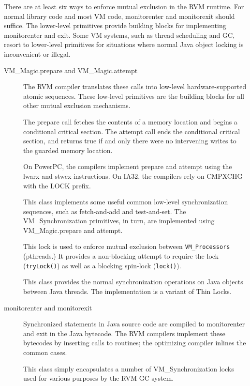 There are at least six ways to enforce mutual exclusion in the
RVM runtime.  For normal library code and most VM code, monitorenter and
monitorexit should suffice.  The lower-level primitives provide 
building blocks for implementing monitorenter and exit. Some VM systems,
such as thread scheduling and GC, resort to lower-level primitives for
situations where normal Java object locking is inconvenient or illegal.
\begin{description}
\item [VM\_Magic.prepare and VM\_Magic.attempt]
The RVM compiler translates these 
calls into low-level
hardware-supported atomic sequences.  These low-level primitives are the 
building blocks for all other mutual exclusion mechanisms. 

The prepare call fetches the
contents of a memory location and begins a conditional critical section.
The attempt call ends the conditional critical section, and returns true
if and only there were no intervening writes to the guarded memory
location.

On PowerPC, the compilers implement prepare and attempt using the lwarx
and stwcx instructions.  On IA32, the compilers rely on CMPXCHG with the
LOCK prefix.
\item []
This class implements some useful common low-level synchronization
sequences, such as fetch-and-add and test-and-set.  The VM\_Synchronization
primitives, in turn, are implemented using VM\_Magic.prepare and attempt.
\item [
]
This lock is used to enforce mutual exclusion between {\tt VM\_Processors}
(pthreads.)  It provides a non-blocking attempt to require the lock
({\tt tryLock()}) as well as a blocking spin-lock ({\tt lock()}).
\item [
]
This class provides the normal synchronization operations on Java objects
between Java threads.  The implementation is a variant of Thin Locks.
\item [monitorenter and monitorexit]
Synchronized statements in Java source code are compiled to monitorenter
and exit in the Java bytecode.  The RVM compilers implement these
bytecodes by inserting calls to  routines; 
the optimizing
compiler inlines the common cases.
\item []
This class simply encapsulates a number of VM\_Synchronization locks 
used for various purposes by the RVM GC system.

\end{description}

